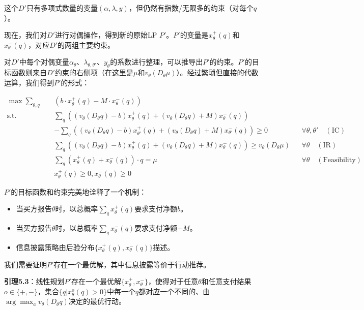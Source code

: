 这个$D'$只有多项式数量的变量$(\alpha,\lambda,y)$，但仍然有指数/无限多的约束（对每个$q$）。

现在，我们对$D'$进行对偶操作，得到新的原始LP $P'$。$P'$的变量是$x_{\theta}^{+}(q)$和$x_{\theta}^{-}(q)$，对应$D'$的两组主要约束。

对$D'$中每个对偶变量$\alpha_\theta$、$\lambda_{\theta,\theta'}$、$y_\theta$的系数进行整理，可以推导出$P'$的约束。$P'$的目标函数则来自$D'$约束的右侧项（在这里是$\mu$和$v_\theta(D_\theta \mu)$）。经过繁琐但直接的代数运算，我们得到$P'$的形式：

\begin{align*}
    \max \sum_{\theta, q} \quad & \left( b \cdot x_{\theta}^{+}(q) - M \cdot x_{\theta}^{-}(q) \right) \\
    \text{s.t.} \quad & \sum_{q} \left((v_{\theta}(D_{\theta}q) - b)x_{\theta}^{+}(q) + (v_{\theta}(D_{\theta}q) + M)x_{\theta}^{-}(q)\right) \\
    & - \sum_{q} \left((v_{\theta}(D_{\theta}q) - b)x_{\theta'}^{+}(q) + (v_{\theta}(D_{\theta}q) + M)x_{\theta'}^{-}(q)\right) \geq 0 && \forall \theta, \theta' \quad (\text{IC}) \\
    & \sum_{q} \left((v_{\theta}(D_{\theta}q) - b)x_{\theta}^{+}(q) + (v_{\theta}(D_{\theta}q) + M)x_{\theta}^{-}(q)\right) \geq v_{\theta}(D_{\theta}\mu) && \forall \theta \quad (\text{IR}) \\
    & \sum_{q} (x_{\theta}^{+}(q) + x_{\theta}^{-}(q)) \cdot q = \mu && \forall \theta \quad (\text{Feasibility}) \\
    & x_{\theta}^{+}(q) \geq 0, x_{\theta}^{-}(q) \geq 0
\end{align*}

$P'$的目标函数和约束完美地诠释了一个机制：
\begin{itemize}
    \item 当买方报告$\theta$时，以总概率$\sum\limits_{q} x_{\theta}^{+}(q)$要求支付净额$b$。
    \item 当买方报告$\theta$时，以总概率$\sum\limits_{q} x_{\theta}^{-}(q)$要求支付净额$-M$。
    \item 信息披露策略由后验分布$\{x_{\theta}^{+}(q), x_{\theta}^{-}(q)\}$描述。
\end{itemize}

我们需要证明$P'$存在一个最优解，其中信息披露等价于行动推荐。

\textbf{引理5.3}：线性规划$P'$存在一个最优解$\{x_{\theta}^{+},x_{\theta}^{-}\}$，使得对于任意$\theta$和任意支付结果$o \in \{+,-\}$，集合$\{q|x_{\theta}^{o}(q) > 0\}$中每一个$q$都对应一个不同的、由$\arg \max_{a}v_{\theta}(D_{\theta} q)$决定的最优行动。

